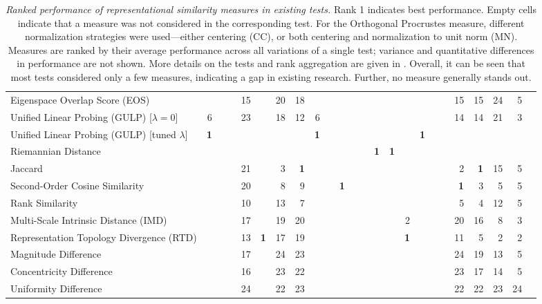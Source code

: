 \begin{table}
{{\begin{tabular}{l|r|r|r|r|r|r|r|r||r|r|r|r|r|r|r|r|r|r|r|r|r|r|r}
\rowcolor{Gray}Eigenspace Overlap Score (EOS) & & & & 15 & & 20 & 18 & & & & & & & & & & & & 15 & 15 & 24 & 5 \\
Unified Linear Probing (GULP) [$\lambda=0$] & 6 & & & 23 & & 18 & 12 & 6 & & & & & & & & & & & 14 & 14 & 21 & 3 \\
\rowcolor{Gray}Unified Linear Probing (GULP) [tuned $\lambda$] & \textbf{1} & & & & & & & \textbf{1} & & & & & & & & \textbf{1} & & & & & & \\
Riemannian Distance & & & & & & & & & & & & & \textbf{1} & \textbf{1} & & & & & & & & \\
\rowcolor{Gray}Jaccard & & & & 21 & & 3 & \textbf{1} & & & & & & & & & & & & 2 & \textbf{1} & 15 & 5 \\
Second-Order Cosine Similarity & & & & 20 & & 8 & 9 & & & \textbf{1} & & & & & & & & & \textbf{1} & 3 & 5 & 5 \\
\rowcolor{Gray}Rank Similarity & & & & 10 & & 13 & 7 & & & & & & & & & & & & 5 & 4 & 12 & 5 \\
Multi-Scale Intrinsic Distance (IMD) & & & & 17 & & 19 & 20 & & & & & & & & 2 & & & & 20 & 16 & 8 & 3 \\
\rowcolor{Gray}Representation Topology Divergence (RTD) & & & & 13 & \textbf{1} & 17 & 19 & & & & & & & & \textbf{1} & & & & 11 & 5 & 2 & 2 \\
Magnitude Difference & & & & 17 & & 24 & 23 & & & & & & & & & & & & 24 & 19 & 13 & 5 \\
\rowcolor{Gray}Concentricity Difference & & & & 16 & & 23 & 22 & & & & & & & & & & & & 23 & 17 & 14 & 5 \\
Uniformity Difference & & & & 24 & & 22 & 23 & & & & & & & & & & & & 22 & 22 & 23 & 24 \\
\bottomrule
\end{tabular}
}
}
\caption{
\emph{Ranked performance of representational similarity measures in existing tests.} 
Rank 1 indicates best performance.
Empty cells indicate that a measure was not considered in the corresponding test.
For the Orthogonal Procrustes measure, different normalization strategies were used---either centering (CC), or both centering and normalization to unit norm (MN). 
Measures are ranked by their average performance across all variations of a single test; variance and quantitative differences in performance are not shown.
More details on the tests and rank aggregation are given in .
Overall, it can be seen that most tests considered only a few measures, indicating a gap in existing research.
Further, no measure generally stands out.
}
\label{tab:evaluations_ranks}
\end{table}
